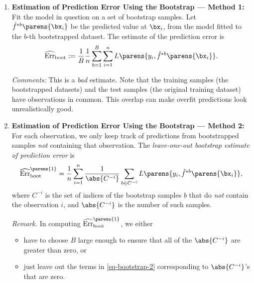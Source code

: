 \documentclass[12pt]{article}
\begin{document}
\begin{enumerate}[label=\textbf{\arabic*.}]
	\item \textbf{Estimation of Prediction Error Using the Bootstrap --- Method 1:} Fit the model in question on a set of bootstrap samples. Let $\hat{f}^{*b} \parens{\bx_i}$ be the predicted value at $\bx_i$, from the model fitted to the $b$-th bootstrapped dataset. The estimate of the prediction error is 
	\begin{align}
		\widehat{\mathrm{Err}}_{\mathrm{boot}} := \frac{1}{B} \frac{1}{n} \sum_{b=1}^B \sum_{i=1}^n L \parens{y_i, \hat{f}^{*b} \parens{\bx_i}}. 
	\end{align}
	
	\textit{Comments:} This is a \emph{bad} estimate. Note that the training samples (the bootstrapped datasets) and the test samples (the original training dataset) have observations in common. This overlap can make overfit predictions look unrealistically good. 
	
	\item \textbf{Estimation of Prediction Error Using the Bootstrap --- Method 2:} For each observation, we only keep track of predictions from bootstrapped samples \emph{not} containing that observation. The \textit{leave-one-out bootstrap estimate of prediction error} is 
	\begin{align}\label{eq-bootstrap-2}
		\widehat{\mathrm{Err}}_{\mathrm{boot}}^{\parens{1}} = \frac{1}{n} \sum_{i=1}^n \frac{1}{\abs{C^{-i}}} \sum_{b \in C^{-i}} L \parens{y_i, \hat{f}^{*b} \parens{\bx_i}}, 
	\end{align}
	where $C^{-i}$ is the set of indices of the bootstrap samples $b$ that do \emph{not} contain the observation $i$, and $\abs{C^{-i}}$ is the number of such samples. 
	
	\textit{Remark.} In computing $\widehat{\mathrm{Err}}_{\mathrm{boot}}^{\parens{1}}$, we either 
	\begin{itemize}
		\item have to choose $B$ large enough to ensure that all of the $\abs{C^{-i}}$ are greater than zero, or 
		\item just leave out the terms in \eqref{eq-bootstrap-2} corresponding to $\abs{C^{-i}}$'s that are zero. 
	\end{itemize}
	

\end{enumerate}
\end{document}
